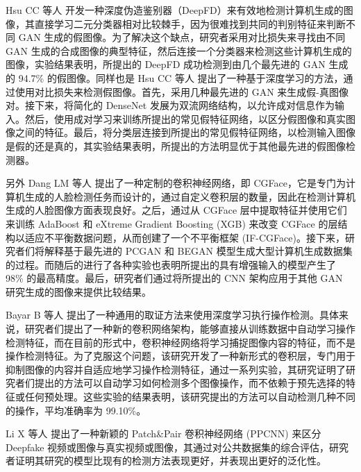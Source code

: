 Hsu CC 等人 \cite{hsu2018learning} 开发一种深度伪造鉴别器（DeepFD）来有效地检测计算机生成的图像，其直接学习二元分类器相对比较棘手，因为很难找到共同的判别特征来判断不同 GAN 生成的假图像。为了解决这个缺点，研究者采用对比损失来寻找由不同 GAN 生成的合成图像的典型特征，然后连接一个分类器来检测这些计算机生成的图像，实验结果表明，所提出的 DeepFD 成功检测到由几个最先进的 GAN 生成的 94.7\% 的假图像。同样也是 Hsu CC 等人 \cite{hsu2020deep} 提出了一种基于深度学习的方法，通过使用对比损失来检测假图像。首先，采用几种最先进的 GAN 来生成假-真图像对。接下来，将简化的 DenseNet 发展为双流网络结构，以允许成对信息作为输入。然后，使用成对学习来训练所提出的常见假特征网络，以区分假图像和真实图像之间的特征。最后，将分类层连接到所提出的常见假特征网络，以检测输入图像是假的还是真的，其实验结果表明，所提出的方法明显优于其他最先进的假图像检测器。

另外 Dang LM 等人 \cite{dang2018deep} 提出了一种定制的卷积神经网络，即 CGFace，它是专门为计算机生成的人脸检测任务而设计的，通过自定义卷积层的数量，因此在检测计算机生成的人脸图像方面表现良好。之后，通过从 CGFace 层中提取特征并使用它们来训练 AdaBoost 和 eXtreme Gradient Boosting (XGB) 来改变 CGFace 的层结构以适应不平衡数据问题，从而创建了一个不平衡框架 (IF-CGFace)。接下来，研究者们将解释基于最先进的 PCGAN 和 BEGAN 模型生成大型计算机生成数据集的过程。而随后的进行了各种实验也表明所提出的具有增强输入的模型产生了 98\% 的最高精度。最后，研究者们通过将所提出的 CNN 架构应用于其他 GAN 研究生成的图像来提供比较结果。

Bayar B 等人 \cite{bayar2016deep} 提出了一种通用的取证方法来使用深度学习执行操作检测。具体来说，研究者们提出了一种新的卷积网络架构，能够直接从训练数据中自动学习操作检测特征，而在目前的形式中，卷积神经网络将学习捕捉图像内容的特征，而不是操作检测特征。为了克服这个问题，该研究开发了一种新形式的卷积层，专门用于抑制图像的内容并自适应地学习操作检测特征，通过一系列实验，其研究证明了研究者们提出的方法可以自动学习如何检测多个图像操作，而不依赖于预先选择的特征或任何预处理。这些实验的结果表明，该研究提出的方法可以自动检测几种不同的操作，平均准确率为 99.10\%。

Li X 等人 \cite{li2020fighting} 提出了一种新颖的 Patch\&Pair 卷积神经网络 (PPCNN) 来区分 Deepfake 视频或图像与真实视频或图像，其通过对公共数据集的综合评估，研究者证明其研究的模型比现有的检测方法表现更好，并表现出更好的泛化性。

